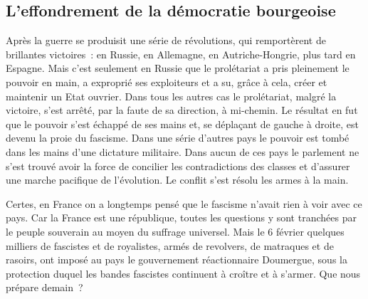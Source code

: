 \documentclass[french,twoside]{book} %
\begin{document}
\subsection[{L’effondrement de la démocratie bourgeoise}]{L’effondrement de la démocratie bourgeoise}
\noindent Après la guerre se produisit une série de révolutions, qui remportèrent de brillantes victoires : en Russie, en Allemagne, en Autriche-Hongrie, plus tard en Espagne. Mais c’est seulement en Russie que le prolétariat a pris pleinement le pouvoir en main, a exproprié ses exploiteurs et a su, grâce à cela, créer et maintenir un Etat ouvrier. Dans tous les autres cas le prolétariat, malgré la victoire, s’est arrêté, par la faute de sa direction, à mi-chemin. Le résultat en fut que le pouvoir s’est échappé de ses mains et, se déplaçant de gauche à droite, est devenu la proie du fascisme. Dans une série d’autres pays le pouvoir est tombé dans les mains d’une dictature militaire. Dans aucun de ces pays le parlement ne s’est trouvé avoir la force de concilier les contradictions des classes et d’assurer  une marche pacifique de l’évolution. Le conflit s’est résolu les armes à la main.\par
Certes, en France on a longtemps pensé que le fascisme n’avait rien à voir avec ce pays. Car la France est une république, toutes les questions y sont tranchées par le peuple souverain au moyen du suffrage universel. Mais le 6 février quelques milliers de fascistes et de royalistes, armés de revolvers, de matraques et de rasoirs, ont imposé au pays le gouvernement réactionnaire Doumergue, sous la protection duquel les bandes fascistes continuent à croître et à s’armer. Que nous prépare demain ?\par
\end{document}
